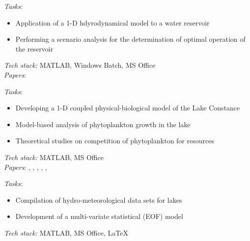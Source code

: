 \documentclass[
	a4paper,
]{fortysecondscv}
\begin{document}
\begin{cvtable}[1.0]
	{\href{https://www.ufz.de/en}{\color{pblue}{UFZ, Germany}}}
	{\textit{Tasks}:
	\begin{itemize}[topsep=0pt,itemsep=0pt,partopsep=0pt, parsep=0pt, leftmargin=*]
     \item Application of a 1-D hdyrodynamical model to a water reservoir
     \item Performing a scenario analysis for the determination of optimal operation of the reservoir
    \end{itemize}
      \textit{Tech stack:} MATLAB, Windows Batch, MS Office \\
      \textit{Papers}:
      \href{https://doi.org/10.1002/2013WR013520}{\color{pblue}{1}}
      }
      
	{\href{https://www.uni-konstanz.de/}{\color{pblue}{Uni. Konstanz, Germany}}}
	{\textit{Tasks}:
	\begin{itemize}[topsep=0pt,itemsep=0pt,partopsep=0pt, parsep=0pt, leftmargin=*]
     \item Developing a 1-D coupled physical-biological model of the Lake Constance
     \item Model-based analysis of phytoplankton growth in the lake
     \item Theoretical studies on competition of phytoplankton for resources 
    \end{itemize}
      \textit{Tech stack:} MATLAB, MS Office \\
      \textit{Papers}:
      \href{https://doi.org/10.1111/j.1365-2486.2009.02158.x}{\color{pblue}{1}},
      \href{https://doi.org/10.1016/j.jtbi.2012.01.044}{\color{pblue}{2}},
      \href{https://doi.org/10.1007/s12080-012-0164-2}{\color{pblue}{3}},
      \href{https://doi.org/10.1111/j.1600-0706.2012.20603.x}{\color{pblue}{4}},
      \href{https://doi.org/10.1007/s10750-013-1551-4}{\color{pblue}{5}},
      \href{https://doi.org/10.1890/14-0839.1}{\color{pblue}{6}}
      }
      
	{\href{https://https://www.metu.edu.tr/}{\color{pblue}{METU, Turkey}}}
	{\textit{Tasks}:
	\begin{itemize}[topsep=0pt,itemsep=0pt,partopsep=0pt, parsep=0pt, leftmargin=*]
     \item Compilation of hydro-meteorological data sets for lakes
     \item Development of a multi-variate statistical (EOF) model
     \end{itemize}
     \textit{Tech stack:} MATLAB, MS Office, \LaTeX \\
     }
\end{cvtable}
\end{document}

